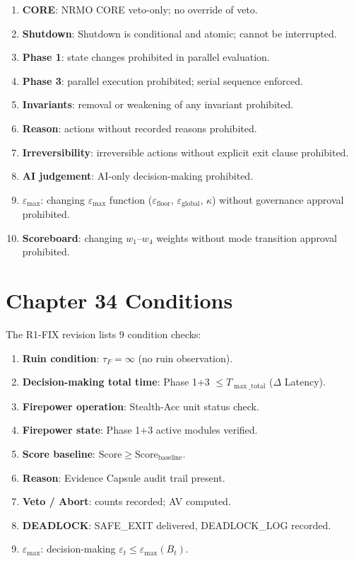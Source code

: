 \begin{enumerate}
\item \textbf{CORE}: NRMO CORE veto-only; no override of veto.
\item \textbf{Shutdown}: Shutdown is conditional and atomic; cannot
be interrupted.
\item \textbf{Phase 1}: state changes prohibited in parallel
evaluation.
\item \textbf{Phase 3}: parallel execution prohibited; serial
sequence enforced.
\item \textbf{Invariants}: removal or weakening of any invariant
prohibited.
\item \textbf{Reason}: actions without recorded reasons prohibited.
\item \textbf{Irreversibility}: irreversible actions without explicit
exit clause prohibited.
\item \textbf{AI judgement}: AI-only decision-making prohibited.
\item \textbf{$\varepsilon_{\max}$}: changing $\varepsilon_{\max}$
function ($\varepsilon_{\mathrm{floor}}$, $\varepsilon_{\mathrm{global}}$,
$\kappa$) without governance approval prohibited.
\item \textbf{Scoreboard}: changing $w_1$--$w_4$ weights without
mode transition approval prohibited.
\end{enumerate}

\section{Chapter 34 Conditions}
\label{sec:r1fix-conditions-summary}

The R1-FIX revision lists 9 condition checks:

\begin{enumerate}
\item \textbf{Ruin condition}: $\tau_F = \infty$ (no ruin
observation).
\item \textbf{Decision-making total time}: Phase 1+3
$\le T_{\max\_\mathrm{total}}$ ($\Delta$ Latency).
\item \textbf{Firepower operation}: Stealth-Acc unit status check.
\item \textbf{Firepower state}: Phase 1+3 active modules verified.
\item \textbf{Score baseline}:
$\mathrm{Score} \ge \mathrm{Score}_{\mathrm{baseline}}$.
\item \textbf{Reason}: Evidence Capsule audit trail present.
\item \textbf{Veto / Abort}: counts recorded; AV computed.
\item \textbf{DEADLOCK}: SAFE\_EXIT delivered, DEADLOCK\_LOG
recorded.
\item \textbf{$\varepsilon_{\max}$}: decision-making
$\varepsilon_t \le \varepsilon_{\max}(B_t)$.
\end{enumerate}

